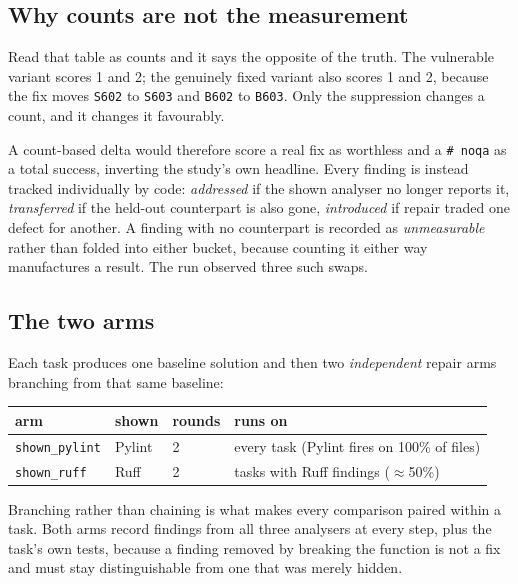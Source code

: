\documentclass[11pt]{article}
\newcommand{\code}[1]{\texttt{\small #1}}
\begin{document}
\subsection{Why counts are not the measurement}

Read that table as counts and it says the opposite of the truth. The vulnerable
variant scores 1 and 2; the genuinely fixed variant also scores 1 and 2, because
the fix moves \code{S602} to \code{S603} and \code{B602} to \code{B603}. Only the
suppression changes a count, and it changes it favourably.

A count-based delta would therefore score a real fix as worthless and a
\code{\# noqa} as a total success, inverting the study's own headline. Every
finding is instead tracked individually by code: \emph{addressed} if the shown
analyser no longer reports it, \emph{transferred} if the held-out counterpart is
also gone, \emph{introduced} if repair traded one defect for another. A finding
with no counterpart is recorded as \emph{unmeasurable} rather than folded into
either bucket, because counting it either way manufactures a result. The run
observed three such swaps.

\subsection{The two arms}

Each task produces one baseline solution and then two \emph{independent} repair
arms branching from that same baseline:

\begin{table}[htbp]
\centering
\small
\begin{tabular}{@{}llll@{}}
\toprule
\textbf{arm} & \textbf{shown} & \textbf{rounds} & \textbf{runs on} \\
\midrule
\code{shown\_pylint} & Pylint & 2 & every task (Pylint fires on 100\% of files) \\
\code{shown\_ruff}   & Ruff   & 2 & tasks with Ruff findings ($\approx$50\%) \\
\bottomrule
\end{tabular}
\end{table}

Branching rather than chaining is what makes every comparison paired within a
task. Both arms record findings from all three analysers at every step, plus the
task's own tests, because a finding removed by breaking the function is not a fix
and must stay distinguishable from one that was merely hidden.
\end{document}
